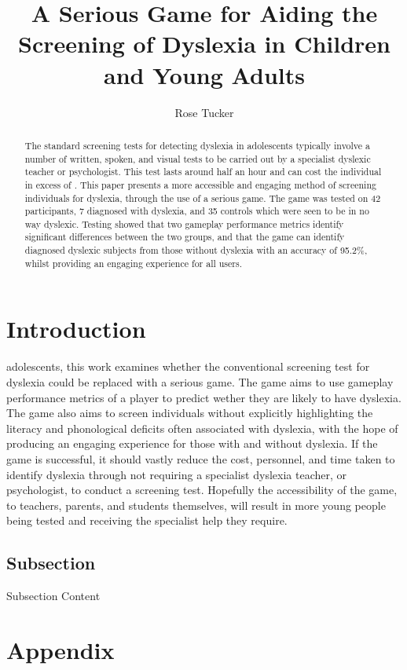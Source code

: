 \documentclass[journal]{IEEEtran}
\begin{document}
\title{\textbf{A Serious Game for Aiding the Screening of Dyslexia in Children and Young Adults}}
\author{Rose Tucker}

\maketitle


\begin{abstract}
The standard screening tests for detecting dyslexia in adolescents typically involve a number of written,
 spoken, and visual tests to be carried out by a specialist dyslexic teacher or psychologist.
This test lasts around half an hour and can cost the individual in excess of . 
This paper presents a more accessible and engaging method of screening individuals
 for dyslexia, through the use of a serious game. 
The game was tested on 42 participants, 7 diagnosed with dyslexia, and 35 controls which were seen to be in no way dyslexic. 
Testing showed that two gameplay performance metrics identify significant differences between the two groups, and that the game can identify diagnosed dyslexic subjects from those without dyslexia with an accuracy of 95.2\%, whilst providing an engaging experience for all users.
\end{abstract}

\section{Introduction}
 adolescents, this work examines whether the conventional screening
test for dyslexia could be replaced with a serious game. The game aims to use gameplay performance metrics of a player to predict wether they are likely to have dyslexia. The game also aims to screen individuals without explicitly highlighting the literacy and phonological deficits often associated with dyslexia, with the hope of 
producing an engaging experience for those with and without dyslexia. 
If the game is successful, it should vastly reduce the cost, personnel, and time taken to 
identify dyslexia through not requiring a specialist dyslexia teacher, or psychologist, to 
conduct a screening test\cite{bda, dast}. Hopefully the accessibility of the game, to 
teachers, parents, and students themselves, will result in more
young people being tested and receiving the specialist help they require.

\subsection{Subsection}
Subsection Content


\section{Appendix}
\end{document}
